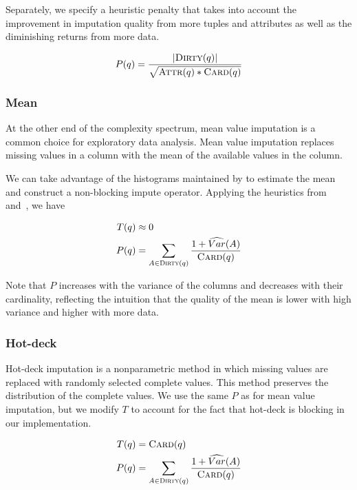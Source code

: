 {Separately, we specify a heuristic penalty that takes into account the
improvement in imputation quality from more tuples and attributes as well as
the diminishing returns from more data.

\[
    P(q) = \frac{|\textsc{Dirty}(q)|}{\sqrt{ \textsc{Attr}(q) * \textsc{Card}(q)}}
\]

\subsubsection{Mean}

At the other end of the complexity spectrum, mean value imputation is a common choice for exploratory data analysis.
Mean value imputation replaces missing values in a column with the mean of the available values in the column.

We can take advantage of the histograms maintained by \ProjectName{} to estimate the mean and construct a non-blocking impute operator.
Applying the heuristics from~ and~, we
have

\begin{equation*}
\begin{aligned}
    T(q) &\approx 0 \\
    P(q) &= \sum_{A \in \textsc{Dirty}(q)} \frac{1+\widehat{Var}(A)}{\textsc{Card}(q)}
\end{aligned}
\end{equation*}

Note that $P$ increases with the variance of the columns and decreases with their cardinality, reflecting the intuition that the quality of the mean is lower with high variance and higher with more data.

\subsubsection{Hot-deck}

Hot-deck imputation is a nonparametric method in which missing values are replaced with randomly selected complete values.
This method preserves the distribution of the complete values.
We use the same $P$ as for mean value imputation, but we modify $T$ to account for the fact that hot-deck is blocking in our implementation.

\begin{equation*}
\begin{aligned}
    T(q) &= \textsc{Card}(q) \\
    P(q) &= \sum_{A \in \textsc{Dirty}(q)} \frac{1+\widehat{Var}(A)}{\textsc{Card}(q)}
\end{aligned}
\end{equation*}
}

